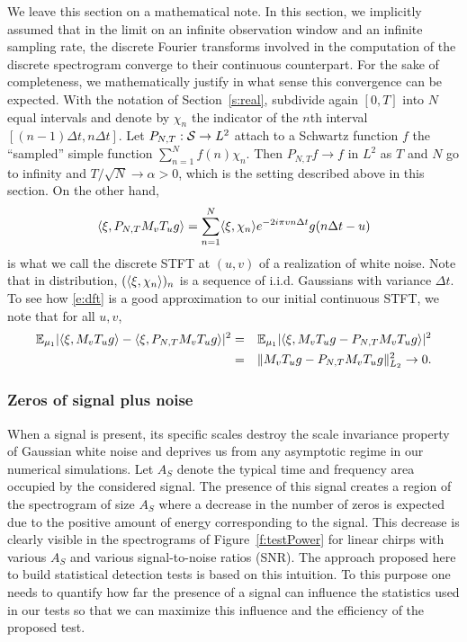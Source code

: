 We leave this section on a mathematical note. In this section, we implicitly assumed that in the limit on an infinite
observation window and an infinite sampling rate, the discrete Fourier
transforms involved in the computation of the discrete spectrogram converge to
their continuous counterpart. For the sake of completeness, we mathematically
justify in what sense this convergence can be expected. With the notation of Section~\ref{s:real},
subdivide again $[0,T]$ into $N$ equal intervals and denote by $\chi_{n}$ the indicator of the $n$th
interval $[(n-1)\Delta t, n\Delta t]$. Let $P_{N,T}:\mathcal{S}\rightarrow L^2$ attach
to a Schwartz function $f$ the ``sampled'' simple function $\sum_{n=1}^N
f(n)\chi_n$. Then $P_{N,T}f\rightarrow f$ in $L^2$ as $T$ and $N$ go to infinity
and $T/\sqrt{N}\rightarrow \alpha>0$, which is the setting described above in
this section. On the other hand, 
\begin{equation}
\label{e:dft}
\langle \xi, P_{N,T}M_vT_u g\rangle = \sum_{n=1}^N\langle \xi,\chi_n
\rangle e^{-2i\pi v n\Delta t} g(n\Delta t-u)
\end{equation}
is what we call the discrete STFT at $(u,v)$ of a realization of white
noise. Note that in distribution, $(\langle \xi,\chi_n \rangle)_n$ is a
sequence of i.i.d. Gaussians with variance $\Delta t$. To see how \eqref{e:dft} is a good
approximation to our initial continuous STFT, we note that for all $u,v$,
\begin{eqnarray*}
\mathbb{E}_{\mu_1}\vert\langle \xi,  M_{v}T_u g\rangle - \langle \xi,
  P_{N,T} M_{v}T_u g\rangle\vert^2 &=& \mathbb{E}_{\mu_1}\vert\langle \xi,
                                       M_{v}T_u g
  - P_{N,T} M_{v}T_u g\rangle\vert^2\\
&=& \Vert  M_{v}T_u g
  - P_{N,T} M_{v}T_u g \Vert^2_{L_2} \rightarrow 0.
\end{eqnarray*}


\subsubsection{Zeros of signal plus noise}
\label{s:signalplusnoise}

When a signal is present, its specific scales destroy the scale invariance
property of Gaussian white noise and deprives us from any asymptotic regime in
our numerical simulations. Let $A_S$ denote the typical time and frequency area
occupied by the considered signal. The presence of this signal creates a region
of the spectrogram of size $A_S$ where a decrease in the number of zeros is
expected due to the positive amount of energy corresponding to the signal. This
decrease is clearly visible in the spectrograms of Figure~\ref{f:testPower} for
linear chirps with various $A_S$ and various signal-to-noise ratios (SNR).
The approach proposed here to build statistical detection tests is based on this
intuition. To this purpose one needs to quantify how far the presence of a
signal can influence the statistics used in our tests so that we can maximize
this influence and the efficiency of the proposed test.

